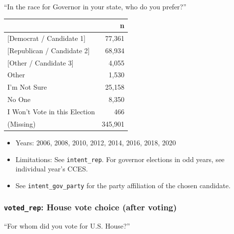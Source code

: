 \documentclass[10pt,article,oneside]{memoir}
\theoremstyle{definition}
\begin{document}
``In the race for Governor in your state, who do you prefer?''

\begin{table}[H]
\centering
\begin{tabular}{lr}
\toprule
 & n\\
\midrule
{[Democrat / Candidate 1]} & 77,361\\
{[Republican / Candidate 2]} & 68,934\\
{[Other / Candidate 3]} & 4,055\\
Other & 1,530\\
I'm Not Sure & 25,158\\
No One & 8,350\\
I Won't Vote in this Election & 466\\
(Missing) & 345,901\\
\bottomrule
\end{tabular}
\end{table}

\begin{itemize}
\tightlist
\item
  Years: 2006, 2008, 2010, 2012, 2014, 2016, 2018, 2020
\item
  Limitations: See \texttt{intent\_rep}. For governor elections in odd
  years, see individual year's CCES.
\item
  See \texttt{intent\_gov\_party} for the party affiliation of the
  chosen candidate.
\end{itemize}

\hypertarget{voted_rep-house-vote-choice-after-voting}{%
\subsubsection{\texorpdfstring{\texttt{voted\_rep}: House vote choice
(after
voting)}{voted\_rep: House vote choice (after voting)}}\label{voted_rep-house-vote-choice-after-voting}}

``For whom did you vote for U.S. House?''
\end{document}
